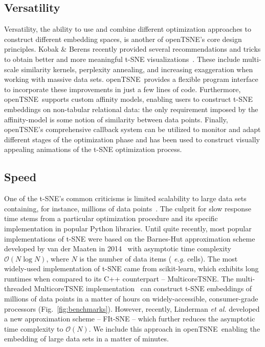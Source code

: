 \documentclass[letter]{article}
\newcommand{\opentsne}{\textsf{openTSNE}}
\begin{document}
\subsection*{Versatility}

Versatility, the ability to use and combine different optimization approaches to
construct different embedding spaces, is another of \opentsne's core design
principles. Kobak \& Berens recently provided several recommendations and
tricks to obtain better and more meaningful t-SNE
visualizations~\cite{kobak2019art}. These include multi-scale similarity
kernels, perplexity annealing, and increasing exaggeration when working with
massive data sets. \opentsne\ provides a flexible program interface to
incorporate these improvements in just a few lines of code. Furthermore, \opentsne\
supports custom affinity models, enabling users to construct t-SNE embeddings on
non-tabular relational data: the only requirement imposed by the affinity-model
is some notion of similarity between data points.
Finally, \opentsne's comprehensive callback system can be utilized
to monitor and adapt different stages of the optimization phase and has been
used to construct visually appealing animations of the t-SNE optimization
process.


\subsection*{Speed}

One of the t-SNE's common criticisms is limited scalability to large data sets
containing, for instance, millions of data
points~\cite{becht2019dimensionality}. The culprit for slow response time stems
from a particular optimization procedure and its specific implementation in
popular Python libraries. Until quite recently, most popular
implementations of t-SNE were based on the Barnes-Hut approximation scheme
developed by van der Maaten in 2014~\cite{van2014accelerating} with asymptotic
time complexity $\mathcal{O}(N \log N)$, where $N$ is the number of data items ({\em
e.g.} cells). The most widely-used implementation of t-SNE came from
\textsf{scikit-learn}, which exhibits long runtimes when compared to its C++
counterpart -- \textsf{MulticoreTSNE}. The multi-threaded \textsf{MulticoreTSNE}
implementation~\cite{Ulyanov2016} can construct t-SNE embeddings of millions of
data points in a matter of hours on widely-accessible, consumer-grade processors
(Fig.~\ref{fig:benchmarks}). However, recently, Linderman \textit{et al.}
developed a new approximation scheme -- FIt-SNE -- which further reduces the
asymptotic time complexity to $\mathcal{O}(N)$. We include this approach in
\opentsne\, enabling the embedding of large data sets in a matter of minutes. 
\end{document}

